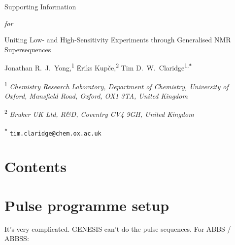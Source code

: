 \documentclass[a4paper,12pt]{article}
\newcommand{\articletitle}{\todo{Uniting Low- and High-Sensitivity Experiments through Generalised NMR Supersequences}}
\newcommand{\crl}{Chemistry Research Laboratory, Department of Chemistry, University of Oxford, Mansfield Road, Oxford, OX1 3TA, United Kingdom}
\newcommand{\brukeruk}{Bruker UK Ltd, R\&D, Coventry CV4 9GH, United Kingdom}
\newcommand{\todo}[1]{{\color{OrangeRed}#1}}
\begin{document}
\clearpage
\begin{refsection}
\newcommand{\sectionbreak}{\clearpage}
\renewcommand*{\thefigure}{S\arabic{figure}}
\renewcommand*{\thesection}{S\arabic{section}}
\renewcommand*{\thetable}{S\arabic{table}}
\renewcommand*{\thepage}{S\arabic{page}}
\setcounter{page}{1}
\setcounter{figure}{0}
\setcounter{section}{0}
\setcounter{table}{0}
\onehalfspacing

\hspace{0pt}
\vfill
\begin{center}
    \huge
    Supporting Information

    \vspace{0.3cm}

    \textit{for}

    \vspace{0.3cm}

    \articletitle{}

    \vspace{0.6cm}

    \Large Jonathan R.\ J.\ Yong,\textsuperscript{1} {\=E}riks Kup{\v{c}}e,\textsuperscript{2} Tim D.\ W.\ Claridge\textsuperscript{1,\texttt{*}}

    \vspace{0.6cm}

    \large \textsuperscript{1} \textit{\crl{}}

    \textsuperscript{2} \textit{\brukeruk{}}

    \textsuperscript{\texttt{*}} \texttt{tim.claridge@chem.ox.ac.uk}

\end{center}

\vspace{2cm}
\section*{Contents}

\startcontents[si]
\vfill
\hspace{0pt}
\newpage

\section{Pulse programme setup}

It's very complicated. GENESIS\autocite{Yong2022AC} can't do the pulse sequences. For ABBS / ABBSS:


\end{refsection}
\end{document}
